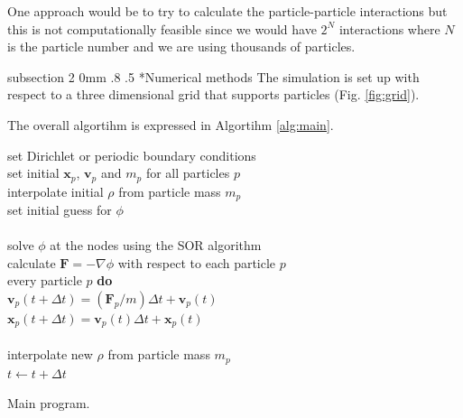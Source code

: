 \documentclass[notitlepage, 12pt]{article}
\makeatletter
\renewcommand{\subsection}{\@startsection    %
        {subsection}
        {2}
        {0mm}
        {.8\baselineskip}
        {.5\baselineskip}
        {\bfseries\normalsize}}
\makeatother
\begin{document}
One approach would be to try to calculate the particle-particle interactions but this is not computationally feasible since we would have $2^N$ interactions where $N$ is the particle number and we are using thousands of particles.  

\subsection*{Numerical methods}\label{ssec:numerical}
The simulation is set up with respect to a three dimensional grid that supports particles (Fig. \ref{fig:grid}).

The overall algortihm is expressed in Algortihm \ref{alg:main}.
\begin{algorithm}[H]
\hspace{0.1\textwidth}\parbox{.8\textwidth}{
\-\hspace{0ex}set Dirichlet or periodic boundary conditions\\
\-\hspace{0ex}set initial $\mathbf{x}_p$, $\mathbf{v}_p$ and $m_p$ for all particles $p$\\
\-\hspace{0ex}interpolate initial $\rho$ from particle mass $m_p$\\
\-\hspace{0ex}set initial guess for $\phi$\\
\-\hspace{0ex}{\bf loop}\\
\-\hspace{4ex}solve $\phi$ at the nodes using the SOR algorithm\\
\-\hspace{4ex}calculate $\mathbf{F}=-\nabla \phi$ with respect to each particle $p$\\
\-\hspace{4ex}{\bf for} every particle $p$ {\bf do}\\
\-\hspace{8ex}$\mathbf{v}_p(t+\Delta t) = (\mathbf{F}_p/m)\Delta t + \mathbf{v}_p(t)$\\
\-\hspace{8ex}$\mathbf{x}_p(t+\Delta t) = \mathbf{v}_p(t)\Delta t + \mathbf{x}_p(t)$\\
\-\hspace{4ex}{\bf end for}\\
\-\hspace{4ex}interpolate new $\rho$ from particle mass $m_p$\\
\-\hspace{4ex}$t\leftarrow t+\Delta t$\\
\-\hspace{0ex}{\bf end loop}}
\caption{Main program.}
\label{alg:main}
\end{algorithm}
\end{document}
